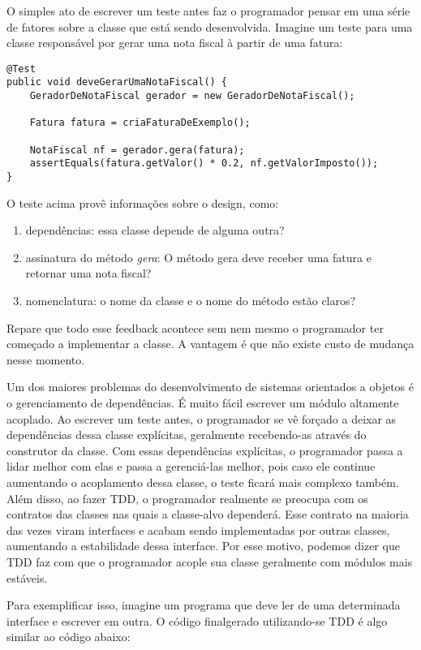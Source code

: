 O simples ato de escrever um teste antes faz o programador pensar em uma série de fatores 
sobre a classe que está sendo desenvolvida. Imagine um teste para uma 
classe responsável por gerar uma nota fiscal à partir de uma fatura:

\begin{lstlisting}[frame=trbl]
@Test
public void deveGerarUmaNotaFiscal() {
	GeradorDeNotaFiscal gerador = new GeradorDeNotaFiscal();
	
	Fatura fatura = criaFaturaDeExemplo();
	
	NotaFiscal nf = gerador.gera(fatura);
	assertEquals(fatura.getValor() * 0.2, nf.getValorImposto());
}
\end{lstlisting}

O teste acima provê informações sobre o design, como:

\begin{enumerate}
	\item dependências: essa classe depende de alguma outra?
	\item assinatura do método \textit{gera}: O método gera deve receber uma fatura e retornar uma nota fiscal?
	\item nomenclatura: o nome da classe e o nome do método estão claros?
\end{enumerate}

Repare que todo esse feedback acontece sem nem mesmo o programador ter começado a implementar a classe. A vantagem é que
não existe custo de mudança nesse momento.

Um dos maiores problemas do desenvolvimento de sistemas orientados a objetos é o gerenciamento de dependências. É muito fácil
escrever um módulo altamente acoplado.
Ao escrever um teste antes, o programador se vê forçado a deixar as dependências dessa classe explícitas, 
geralmente recebendo-as através do construtor da classe. Com essas dependências explícitas, o programador passa a lidar 
melhor com elas e passa a gerenciá-las melhor, pois caso ele continue aumentando o acoplamento dessa classe, o teste ficará
mais complexo também. Além disso, ao fazer TDD, o programador realmente se preocupa com os contratos das classes nas quais
a classe-alvo dependerá. Esse contrato na maioria das vezes viram interfaces e acabam sendo implementadas por outras classes,
aumentando a estabilidade dessa interface. Por esse motivo, podemos dizer que TDD faz com que o programador acople sua classe
geralmente com módulos mais estáveis. 

Para exemplificar isso, imagine um programa que deve ler de uma determinada interface e escrever em outra. O código finalgerado 
utilizando-se TDD é algo similar ao código abaixo:

